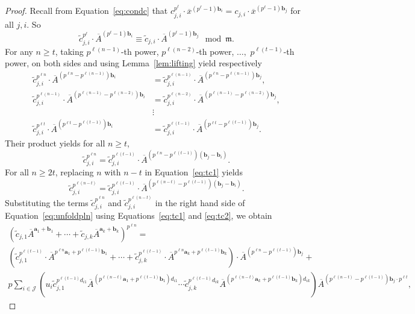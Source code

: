 \documentclass[letterpaper, 11pt, thm-restate]{article}
\numberwithin{equation}{section}
\newcommand{\mJ}{\mathcal{J}}
\newcommand{\ba}{\boldsymbol{a}}
\newcommand{\bb}{\boldsymbol{b}}
\newcommand{\tc}{\widetilde{c}}
\newcommand{\ox}{\overline{x}}
\newcommand{\oA}{\overline{A}}
\newcommand{\frm}{\mathfrak{m}}
\theoremstyle{definition}
\theoremstyle{definition}
\theoremstyle{definition}
\begin{document}
\begin{proof}
    Recall from Equation~\eqref{eq:condc} that $c_{j,i}^{p^{\ell}} \cdot \ox^{(p^{\ell} - 1) \bb_i} = c_{j,i} \cdot \ox^{(p^{\ell}-1)\bb_j}$ for all $j, i$.
    So
    \[
    \tc_{j,i}^{p^{\ell}} \cdot \oA^{(p^{\ell} - 1) \bb_i} \equiv \tc_{j,i} \cdot \oA^{(p^{\ell}-1)\bb_j} \mod \frm.
    \]
    For any $n \geq t$, taking $p^{\ell (n-1)}$-th power, $p^{\ell (n-2)}$-th power, $\ldots,$ $p^{\ell (t-1)}$-th power, on both sides and using Lemma~\ref{lem:lifting} yield respectively
    \begin{align*}
    \tc_{j,i}^{p^{\ell n}} \cdot \oA^{(p^{\ell n} - p^{\ell (n-1)}) \bb_i} & = \tc_{j,i}^{p^{\ell (n-1)}} \cdot \oA^{(p^{\ell n} - p^{\ell (n-1)})\bb_j}, \\
    \tc_{j,i}^{p^{\ell (n-1)}} \cdot \oA^{(p^{\ell (n-1)} - p^{\ell (n-2)}) \bb_i} & = \tc_{j,i}^{p^{\ell (n-2)}} \cdot \oA^{(p^{\ell (n-1)} - p^{\ell (n-2)})\bb_j}, \\
    & \vdots \\
    \tc_{j,i}^{p^{\ell t}} \cdot \oA^{(p^{\ell t} - p^{\ell (t-1)}) \bb_i} & = \tc_{j,i}^{p^{\ell (t-1)}} \cdot \oA^{(p^{\ell t} - p^{\ell (t-1)})\bb_j}.
    \end{align*}
    Their product yields for all $n \geq t$,
    \begin{equation}\label{eq:tc1}
    \tc_{j,i}^{p^{\ell n}} = \tc_{j,i}^{p^{\ell (t-1)}} \cdot \oA^{(p^{\ell n} - p^{\ell (t-1)})(\bb_j - \bb_i)}.
    \end{equation}
    For all $n \geq 2t$, replacing $n$ with $n-t$ in Equation~\eqref{eq:tc1} yields
    \begin{equation}\label{eq:tc2}
    \tc_{j,i}^{p^{\ell (n-t)}} = \tc_{j,i}^{p^{\ell (t-1)}} \cdot \oA^{(p^{\ell (n-t)} - p^{\ell (t-1)})(\bb_j - \bb_i)}.
    \end{equation}
    Substituting the terms $\tc_{j,i}^{p^{\ell n}}$ and $\tc_{j,i}^{p^{\ell (n-t)}}$ in the right hand side of Equation~\eqref{eq:unfoldpln} using Equations~\eqref{eq:tc1} and \eqref{eq:tc2}, we obtain
    \begin{multline}\label{eq:sub1}
        \left(\tc_{j,1} \oA^{\ba_1 + \bb_1} + \cdots + \tc_{j,k} \oA^{\ba_k + \bb_k}\right)^{p^{\ell n}} = \\
        \left(\tc_{j,1}^{p^{\ell (t-1)}} \cdot \oA^{p^{\ell n}\ba_1 + p^{\ell (t-1)} \bb_1} + \cdots + \tc_{j,k}^{p^{\ell (t-1)}} \cdot \oA^{p^{\ell n}\ba_k + p^{\ell (t-1)} \bb_k} \right) \cdot \oA^{(p^{\ell n} - p^{\ell (t-1)}) \bb_j} + \\
        p \sum_{i \in \mJ} \left( u_{i} \tc_{j,1}^{p^{\ell (t-1)}d_{i1}} \oA^{\left(p^{\ell (n-t)}\ba_1 + p^{\ell (t-1)} \bb_1  \right)d_{i1}} \cdots \tc_{j,k}^{p^{\ell (t-1)} d_{ik}} \oA^{\left(p^{\ell (n-t)}\ba_k + p^{\ell (t-1)} \bb_k \right) d_{ik} } \right) \oA^{(p^{\ell (n-t)} - p^{\ell (t-1)}) \bb_j \cdot p^{\ell t}},

\end{multline}
\end{proof}
\end{document}
